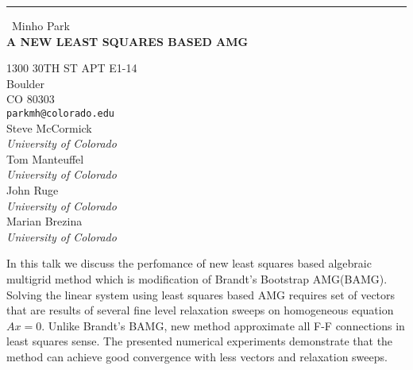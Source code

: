 \documentclass{report}
\begin{document}
\begin{center}
\rule{6in}{1pt} \
{\large Minho Park \\
{\bf A NEW LEAST SQUARES BASED AMG}}

1300 30TH ST APT E1-14 \\ Boulder \\ CO 80303
\\
{\tt parkmh@colorado.edu}\\
Steve McCormick \\
{\em University of Colorado}\\
Tom Manteuffel \\
{\em University of Colorado}\\
John Ruge\\
{\em University of Colorado}\\
Marian Brezina\\
{\em University of Colorado}\end{center}

In this talk we discuss the perfomance of new least squares based
algebraic multigrid method which is modification of Brandt's Bootstrap
AMG(BAMG). Solving the linear system using least squares based AMG
requires set of vectors that are results of several fine level relaxation
sweeps on homogeneous equation $Ax = 0$. Unlike Brandt's BAMG, new method
approximate all F-F connections in least squares sense. The presented
numerical experiments demonstrate that the method can achieve good
convergence with less vectors and relaxation sweeps.
\end{document}
